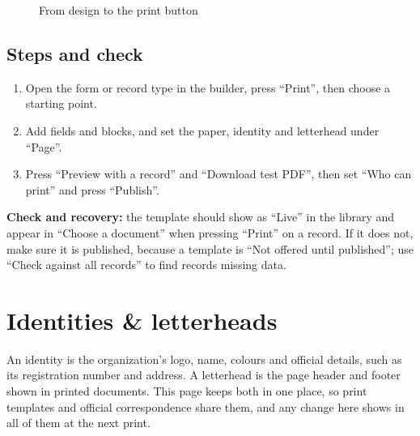 \begin{figure}[H]
\centering
{}
\rclegend
\caption{From design to the print button}
\label{fig:builder-print-flow}
\end{figure}

\subsection{Steps and check}
\begin{enumerate}
\item Open the form or record type in the builder, press “Print”, then choose a starting point.
\item Add fields and blocks, and set the paper, identity and letterhead under “Page”.
\item Press “Preview with a record” and “Download test PDF”, then set “Who can print” and press “Publish”.
\end{enumerate}

\textbf{Check and recovery:} the template should show as “Live” in the library and appear in “Choose a document” when pressing “Print” on a record. If it does not, make sure it is published, because a template is “Not offered until published”; use “Check against all records” to find records missing data.

\clearpage
\section{Identities \& letterheads}
\label{sec:builder-feature-identities}

An identity is the organization's logo, name, colours and official details, such as its registration number and address. A letterhead is the page header and footer shown in printed documents. This page keeps both in one place, so print templates and official correspondence share them, and any change here shows in all of them at the next print.

